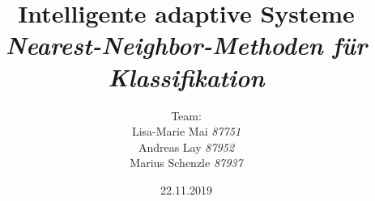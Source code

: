 

\title{\textbf{Intelligente adaptive Systeme}\\\textit{Nearest-Neighbor-Methoden für Klassifikation}}
\author{Team:\\Lisa-Marie Mai \textit{87751}\\Andreas Lay \textit{87952}\\Marius Schenzle \textit{87937} \vspace{10px}}
\date{22.11.2019}


\doublespacing
{}
\maketitle
\newpage
\tableofcontents
\newpage
\singlespacing
{}


\newpage


\newpage


\newpage


\newpage





